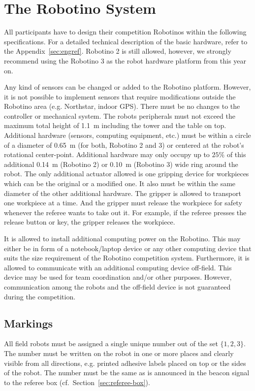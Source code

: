 \documentclass[12pt,twoside]{article}
\newcommand{\Robotino}{Robotino}
\newcommand{\refsec}[1]{Section~\ref{#1}}
\begin{document}
\section{The Robotino System}
\label{sec:robotino}

All participants have to design their competition Robotinos within the
following specifications. For a detailed technical description of the
basic hardware, refer to the Appendix~\ref{sec:engref}. Robotino 2 is
still allowed, however, we strongly recommend using the Robotino 3 as 
the robot hardware platform from this year on.

Any kind of sensors can be changed or added to	 the Robotino platform.
However, it is not possible to implement sensors that require 
modifications outside the Robotino area (e.g. Northstar, indoor GPS).
There must be no changes to the controller or mechanical system.
The robots peripherals must not exceed the maximum total height of 
\SI{1.1}{\metre} including the tower and the table on top. Additional
hardware (sensors, computing equipment, etc.)  must be within a circle 
of a diameter of \SI{0.65}{\metre}  (for both, Robotino 2 and 3) or 
centered at the robot's rotational center-point. Additional hardware 
may only occupy up to $25\%$ of this additional \SI{0.14}{\metre} 
(Robotino 2) or \SI{0.10}{\metre} (Robotino 3) wide ring around the 
robot. The only additional actuator allowed is one gripping device for 
workpieces which can be the original or a modified one. It also must 
be within the same diameter of the other additional hardware. The 
gripper is allowed to transport one workpiece at a time. And the 
gripper must release the workpiece for safety whenever the referee 
wants to take out it. For example, if the referee presses the release 
button or key, the gripper releases the workpiece.

It is allowed to install additional computing power on the
\Robotino. This may either be in form of a notebook/laptop device or
any other computing device that suits the size requirement of the
\Robotino{} competition system. Furthermore, it is allowed to
communicate with an additional computing device off-field. This device
may be used for team coordination and/or other purposes. However,
communication among the robots and the off-field device is not
guaranteed during the competition.

\subsection{Markings}
\label{sec:robot-markings}
All field robots must be assigned a single unique number out of the
set $\{1, 2, 3\}$. The number must be written on the robot in one or
more places and clearly visible from all directions, e.g. printed
adhesive labels placed on top or the sides of the robot. The number
must be the same as is announced in the beacon signal to the referee
box (cf.~\refsec{sec:referee-box}).
\end{document}
